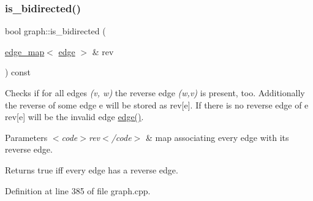 \subsubsection{\texorpdfstring{is\+\_\+bidirected()}{is\_bidirected()}}
{\footnotesize\ttfamily bool graph\+::is\+\_\+bidirected (\begin{DoxyParamCaption}\item[{\mbox{\hyperlink{classedge__map}{edge\+\_\+map}}$<$ \mbox{\hyperlink{classedge}{edge}} $>$ \&}]{rev }\end{DoxyParamCaption}) const}

Checks if for all edges {\itshape (v, w)} the reverse edge {\itshape (w,v)} is present, too. Additionally the reverse of some edge {\ttfamily e} will be stored as {\ttfamily rev\mbox{[}e\mbox{]}}. If there is no reverse edge of {\ttfamily e} {\ttfamily rev\mbox{[}e\mbox{]}} will be the invalid edge {\ttfamily \mbox{\hyperlink{classedge}{edge()}}}.


\begin{DoxyParams}{Parameters}
{\em $<$code$>$rev$<$/code$>$} & map associating every edge with its reverse edge. \\
\hline
\end{DoxyParams}
\begin{DoxyReturn}{Returns}
true iff every edge has a reverse edge. 
\end{DoxyReturn}


Definition at line 385 of file graph.\+cpp.


